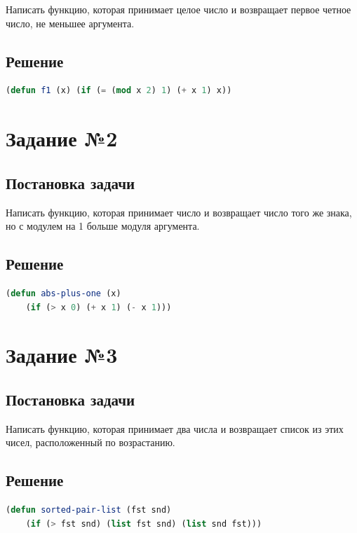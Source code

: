 \documentclass[12pt]{report}
\begin{document}
Написать функцию, которая принимает целое число и возвращает первое четное число, не меньшее аргумента. 

\subsection*{Решение}

\begin{lstlisting}[label=first,caption=Решение задания №1, language=lisp]
(defun f1 (x) (if (= (mod x 2) 1) (+ x 1) x))
\end{lstlisting}

\section*{Задание №2}
\subsection*{Постановка задачи}
Написать функцию, которая принимает число и возвращает число того же знака, но с модулем на 1 больше модуля аргумента.

\subsection*{Решение}

\begin{lstlisting}[label=second,caption=Решение задания №2, language=lisp]
(defun abs-plus-one (x)
	(if (> x 0) (+ x 1) (- x 1)))
\end{lstlisting}

\section*{Задание №3}
\subsection*{Постановка задачи}
Написать функцию, которая принимает два числа и возвращает список из этих чисел, расположенный по возрастанию.

\subsection*{Решение}
\begin{lstlisting}[label=third,caption=Решение задания №3, language=lisp]
(defun sorted-pair-list (fst snd)
	(if (> fst snd) (list fst snd) (list snd fst)))
\end{lstlisting}
\end{document}
